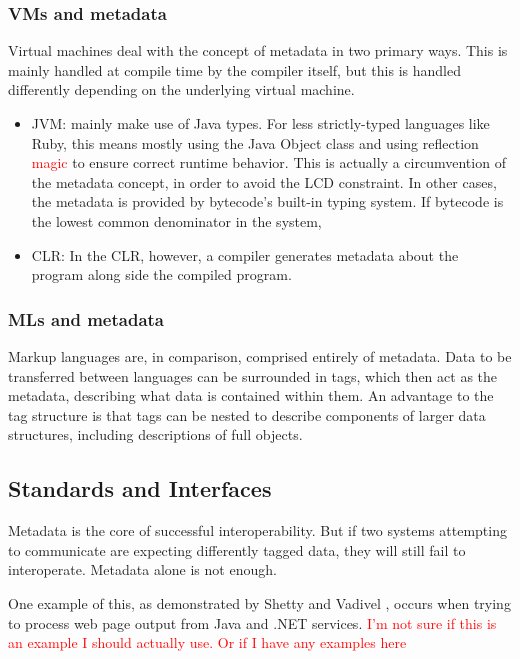 \documentclass{sig-alternate}
\newcommand{\mycomment}[1]{\textcolor{red}{#1}}
\begin{document}
\subsubsection*{VMs and metadata}
Virtual machines deal with the concept of metadata in two primary ways. This is mainly handled at compile time by the compiler itself, but this is handled differently depending on the underlying virtual machine.
\begin{itemize}
\item JVM: mainly make use of Java types. For less strictly-typed languages like Ruby, this means mostly using the Java Object class and using reflection \mycomment{magic} to ensure correct runtime behavior. This is actually a circumvention of the metadata concept, in order to avoid the LCD constraint. In other cases, the metadata is provided by bytecode's built-in typing system. If bytecode is the lowest common denominator in the system, 
\item CLR: In the CLR, however, a compiler generates metadata about the program along side the compiled program\cite{Hamilton:2003}.
\end{itemize}

\subsubsection*{MLs and metadata}
Markup languages are, in comparison, comprised entirely of metadata. Data to be transferred between languages can be surrounded in tags, which then act as the metadata, describing what data is contained within them. An advantage to the tag structure is that tags can be nested to describe components of larger data structures, including descriptions of full objects. 


\subsection{Standards and Interfaces}\label{standards} \mycomment{\cite{Shetty:2009}}
Metadata is the core of successful interoperability. But if two systems attempting to communicate are expecting differently tagged data, they will still fail to interoperate. Metadata alone is not enough.

One example of this, as demonstrated by Shetty and Vadivel \cite{Shetty:2009}, occurs when trying to process web page output from Java and .NET services. \mycomment{I'm not sure if this is an example I should actually use. Or if I have any examples here}
\end{document}
